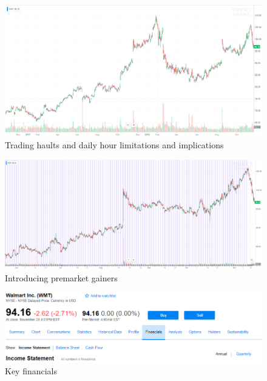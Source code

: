 \documentclass{article}
\begin{document}
\vspace{10pt}

\begin{figure}[!htb]
    \centering
    \includegraphics[width=\textwidth]{imgs/34.png}
    \caption{Trading haults and daily hour limitations and implications}
\end{figure}

\vspace{10pt}

\begin{figure}[!htb]
    \centering
    \includegraphics[width=\textwidth]{imgs/35.png}
    \caption{Introducing premarket gainers}
\end{figure}

\vspace{10pt}

\begin{figure}[!htb]
    \centering
    \includegraphics[width=\textwidth]{imgs/36.png}
    \caption{Key financials}
\end{figure}
\end{document}
